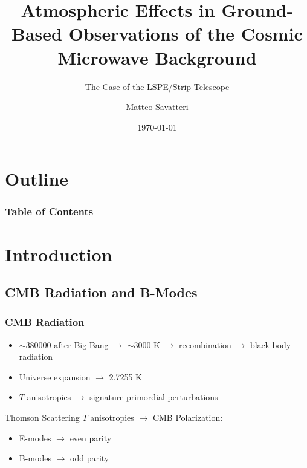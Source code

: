 \documentclass[10pt,aspectratio=169]{beamer}
\title{Atmospheric Effects in Ground-Based Observations of the Cosmic
Microwave Background}
\subtitle{The Case of the LSPE/Strip Telescope}
\author{Matteo Savatteri}
\institute{Università degli Studi di Milano}
\date{\today}
\begin{document}
\frame{\titlepage}

\section*{Outline}
\begin{frame}
\frametitle{Table of Contents}
\tableofcontents
\end{frame}

\section{Introduction}
\subsection{CMB Radiation and B-Modes}

\begin{frame}
\frametitle{CMB Radiation}

\begin{itemize}
\item $\sim$380000 after Big Bang $\rightarrow$ $\sim$3000 K $\rightarrow$ recombination $\rightarrow$
      black body radiation \pause
\item Universe expansion $\rightarrow$ 2.7255 K \pause
\item $T$ anisotropies $\rightarrow$ signature primordial perturbations \pause
\end{itemize}

\vspace{15pt}

Thomson Scattering $T$ anisotropies $\rightarrow$ CMB Polarization: \pause
\begin{itemize}
\item E-modes $\rightarrow$ even parity \pause
\item B-modes $\rightarrow$ odd parity
\end{itemize}

\pause


\end{frame}
\end{document}
